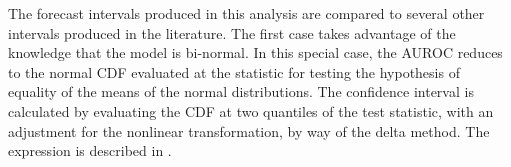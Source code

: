 %
%
%
%
%
%
%
%
%
%
%
%
%
%




The forecast intervals produced in this analysis are compared to several other intervals produced in the literature.
The first case takes advantage of the knowledge that the model is bi-normal.
In this special case, the AUROC reduces to the normal CDF evaluated at the statistic for testing the hypothesis of equality of the means of the normal distributions.
The confidence interval is calculated by evaluating the CDF at two quantiles of the test statistic, with an adjustment for the nonlinear transformation, by way of the delta method.
The expression is described in \citet{demidenko2012}.

